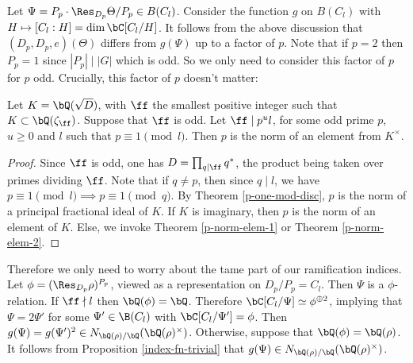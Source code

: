 Let $\Psi = P_p \cdot \Res_{D_p}\Theta / P_p \in B(C_l)$.
Consider the function $g$ on $B(C_l)$ with $H \mapsto [C_l : H] = \dim \bC[C_l / H]$. 
It follows from the above discussion that $(D_p, D_p, e)(\Theta)$ differs from $g(\Psi)$ up to a factor of $p$. Note that if $p = 2$ then $P_p = 1$ since $|P_p| \mid |G|$ which is odd. So we only need to consider this factor of $p$ for $p$ odd.
Crucially, this factor of $p$ doesn't matter:

\begin{lemma}
    Let $K = \bQ(\sqrt{D})$, with $\ff$ the smallest positive integer such that $K \subset \bQ(\zeta_{\ff})$. Suppose that $\ff$ is odd. Let $\ff \mid p^u l $, for some odd prime $p$, $u \geq 0$ and $l$ such that $p \equiv 1 \pmod l$. Then $p$ is the norm of an element from $K^{\times}$.
\end{lemma}

\begin{proof}
    Since $\ff$ is odd, one has $D = \prod_{q | \ff} q^*$, the product being taken over primes dividing $\ff$. Note that if $q \not= p$, then since $q \mid l$, we have $p \equiv 1 \pmod l \implies p \equiv 1 \pmod q$. By Theorem \ref{p-one-mod-disc},  $p$ is the norm of a principal fractional ideal of $K$. If $K$ is imaginary, then $p$ is the norm of an element of $K$. Else, we invoke Theorem \ref{p-norm-elem-1} or Theorem \ref{p-norm-elem-2}.
\end{proof}

Therefore we only need to worry about the tame part of our ramification indices. Let $\phi = (\Res_{D_p} \rho)^{P_p}$, viewed as a representation on $D_p / P_p = C_l$. Then $\Psi$ is a $\phi$-relation. If $\ff \nmid l$ then $\bQ(\phi) = \bQ$. Therefore $\bC[C_l / \Psi] \simeq \phi^{\oplus 2}$, implying that $\Psi = 2\Psi'$ for some $\Psi' \in \B(C_l)$ with $\bC[C_l / \Psi'] = \phi$. Then $g(\Psi) = g(\Psi')^2 \in \fieldnorm{\rho}$. Otherwise, suppose that $\bQ(\phi) = \bQ(\rho)$. It follows from Proposition \ref{index-fn-trivial} that $g(\Psi) \in \fieldnorm{\rho}$.

